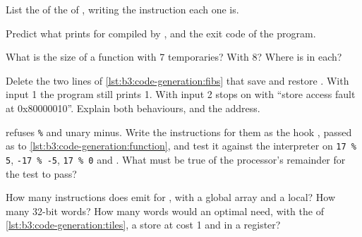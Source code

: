 \begin{exercise}[$\star$]\label{exo:b3:code-generation:2}
List the  of the  of , writing the instruction each one is.
\end{exercise}

\begin{exercise}[$\star$]\label{exo:b3:code-generation:3}
Predict what  prints for  compiled by , and the exit code of the program.
\end{exercise}

\begin{exercise}[$\star$]\label{exo:b3:code-generation:4}
What is the  size of a function with 7 temporaries? With 8? Where is  in each?
\end{exercise}

\begin{exercise}[$\star\star$]\label{exo:b3:code-generation:5}
Delete the two lines of \cref{lst:b3:code-generation:fibs} that save and restore . With input 1 the program still prints 1. With input 2  stops on  with ``store access fault at 0x80000010''. Explain both behaviours, and the address.
\end{exercise}

\begin{exercise}[$\star\star$]\label{exo:b3:code-generation:6}
 refuses \texttt{\%} and unary minus. Write the instructions for them as the hook , passed as  to \cref{lst:b3:code-generation:function}, and test it against the interpreter on \texttt{17 \% 5}, \texttt{-17 \% -5}, \texttt{17 \% 0} and . What must be true of the processor's remainder for the test to pass?
\end{exercise}

\begin{exercise}[$\star\star$]\label{exo:b3:code-generation:7}
How many instructions does  emit for , with  a global array and  a local? How many 32-bit words? How many words would an optimal  need, with the  of \cref{lst:b3:code-generation:tiles}, a store   at cost 1 and  in a register?
\end{exercise}

